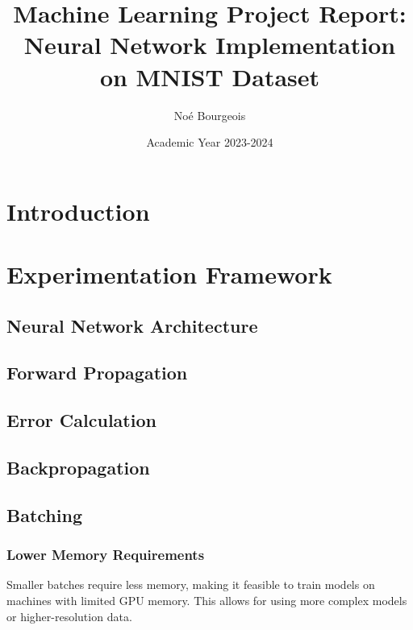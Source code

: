 \documentclass{article}
\title{Machine Learning Project Report: Neural Network Implementation on MNIST Dataset}
\author{Noé Bourgeois}
\date{Academic Year 2023-2024}
\begin{document}
\maketitle

\begin{abstract}
\end{abstract}

\section{Introduction}

\section{Experimentation Framework}

\subsection{Neural Network Architecture}

\subsection{Forward Propagation}

\subsection{Error Calculation}

\subsection{Backpropagation}

\subsection{Batching}
\subsubsection{Lower Memory Requirements}
 Smaller batches require less memory, making it feasible to train models on machines with limited GPU memory. 
 This allows for using more complex models or higher-resolution data.
\end{document}
